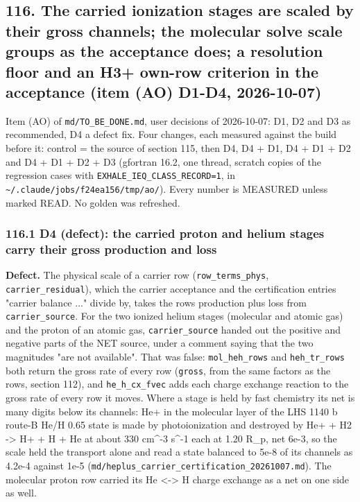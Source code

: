 \documentclass[english,a4paper]{my_memo}
\begin{document}
\subsection{116. The carried ionization stages are scaled by their gross channels; the molecular solve scale groups as the acceptance does; a resolution floor and an H3+ own-row criterion in the acceptance (item (AO) D1-D4, 2026-10-07)}\label{116-the-carried-ionization-stages-are-scaled-by-their-gross-channels-the-molecular-solve-scale-groups-as-the-acceptance-does-a-resolution-floor-and-an-h3-own-row-criterion-in-the-acceptance-item-ao-d1-d4-2026-10-07}

Item (AO) of \texttt{md/TO\_BE\_DONE.md}, user decisions of 2026-10-07: D1, D2 and D3
as recommended, D4 a defect fix. Four changes, each measured against the
build before it: control = the source of section 115, then D4, D4 + D1,
D4 + D1 + D2 and D4 + D1 + D2 + D3 (gfortran 16.2, one thread, scratch
copies of the regression cases with \texttt{EXHALE\_IEQ\_CLASS\_RECORD=1}, in
\texttt{\textasciitilde{}/.claude/jobs/f24ea156/tmp/ao/}). Every number is MEASURED unless marked
READ. No golden was refreshed.

\subsubsection{116.1 D4 (defect): the carried proton and helium stages carry their gross production and loss}\label{1161-d4-defect-the-carried-proton-and-helium-stages-carry-their-gross-production-and-loss}

\textbf{Defect.} The physical scale of a carrier row (\texttt{row\_terms\_phys},
\texttt{carrier\_residual}), which the carrier acceptance and the certification
entries "carrier balance ..." divide by, takes the row\textquotesingle s production plus loss
from \texttt{carrier\_source}. For the two ionized helium stages (molecular and
atomic gas) and the proton of an atomic gas, \texttt{carrier\_source} handed out the
positive and negative parts of the NET source, under a comment saying that
the two magnitudes "are not available". That was false: \texttt{mol\_heh\_rows} and
\texttt{heh\_tr\_rows} both return the gross rate of every row (\texttt{gross}, from the same
factors as the rows, section 112), and \texttt{he\_h\_cx\_fvec} adds each charge
exchange reaction to the gross rate of every row it moves. Where a stage is
held by fast chemistry its net is many digits below its channels: He+ in the
molecular layer of the LHS 1140 b route-B He/H 0.65 state is made by
photoionization and destroyed by He+ + H2 -\textgreater{} H+ + H + He at about 330
cm\^{}-3 s\^{}-1 each at 1.20 R\_p, net 6e-3, so the scale held the transport alone
and read a state balanced to 5e-8 of its channels as 4.2e-4 against 1e-5
(\texttt{md/heplus\_carrier\_certification\_20261007.md}). The molecular proton row
carried its He \textless-\textgreater{} H charge exchange as a net on one side as well.
\end{document}
